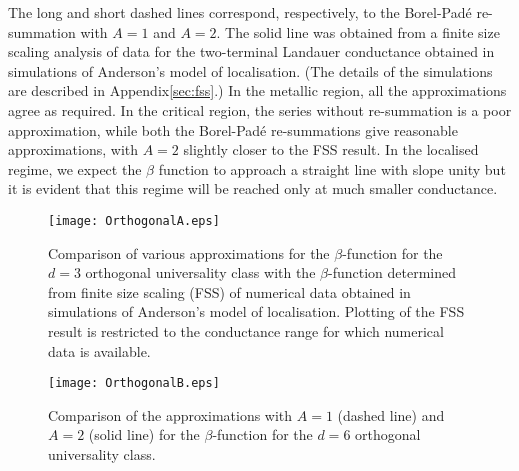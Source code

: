 \documentclass[singlecolumn]{jpsj3}
\begin{document}
The long and short dashed lines correspond, respectively, to the Borel-Pad\'e re-summation with $A=1$ and $A=2$.
The solid line was obtained from a finite size scaling analysis of data for the two-terminal Landauer conductance obtained in simulations of Anderson's model of localisation. (The details of the simulations are described in Appendix\ref{sec:fss}.)
In the metallic region, all the approximations agree as required.
In the critical region, the series without re-summation is a poor approximation, while
both the Borel-Pad\'e re-summations give reasonable approximations, with $A=2$ slightly closer to the
FSS result.
In the localised regime, we expect the $\beta$ function to approach a straight line with slope unity but it is evident that this regime will be reached only at much smaller conductance.

\begin{figure}[tb]
\begin{center}
\texttt{[image: OrthogonalA.eps]}
\caption{Comparison of various approximations for the $\beta$-function for the $d=3$ orthogonal universality class with the $\beta$-function determined from finite size scaling (FSS) of numerical data obtained in simulations of Anderson's model of localisation.
Plotting of the FSS result is restricted to the conductance range for which numerical data is available.}
\label{plot:beta_oa}
\end{center}
\end{figure}


\begin{figure}[tb]
\begin{center}
\texttt{[image: OrthogonalB.eps]}
\caption{Comparison of the approximations with $A=1$ (dashed line) and $A=2$ (solid line) for the $\beta$-function for the $d=6$ orthogonal universality class.}
\label{plot:beta_ob}
\end{center}
\end{figure}
\end{document}
